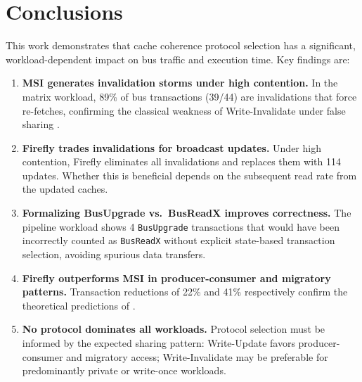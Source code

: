 \documentclass[journal,trans]{IEEEtran}
\begin{document}
\section{Conclusions}
\label{sec:conclusions}
 
This work demonstrates that cache coherence protocol selection has a significant,
workload-dependent impact on bus traffic and execution time. Key findings are:
 
\begin{enumerate}
 
\item \textbf{MSI generates invalidation storms under high contention.}
In the matrix workload, 89\% of bus transactions (39/44) are invalidations that
force re-fetches, confirming the classical weakness of Write-Invalidate under
false sharing \cite{archibald1986cache}.
 
\item \textbf{Firefly trades invalidations for broadcast updates.}
Under high contention, Firefly eliminates all invalidations and replaces them
with 114 updates. Whether this is beneficial depends on the subsequent read
rate from the updated caches.
 
\item \textbf{Formalizing BusUpgrade vs.\ BusReadX improves correctness.}
The pipeline workload shows 4 \texttt{BusUpgrade} transactions that would have
been incorrectly counted as \texttt{BusReadX} without explicit state-based
transaction selection, avoiding spurious data transfers.
 
\item \textbf{Firefly outperforms MSI in producer-consumer and migratory
patterns.} Transaction reductions of 22\% and 41\% respectively confirm the
theoretical predictions of \cite{nagarajan2020primer, thacker1988firefly}.
 
\item \textbf{No protocol dominates all workloads.} Protocol selection must
be informed by the expected sharing pattern: Write-Update favors
producer-consumer and migratory access; Write-Invalidate may be preferable
for predominantly private or write-once workloads.
 
\end{enumerate}
 
\end{document}
